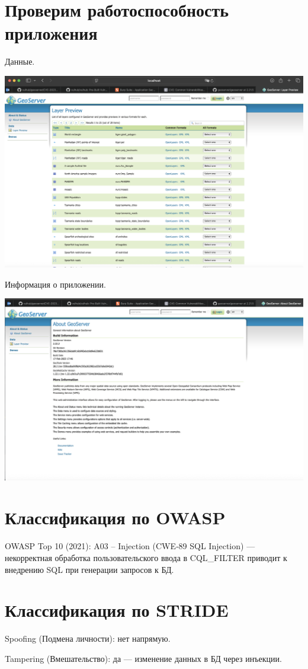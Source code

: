 \documentclass{article}
\begin{document}
\section{Проверим работоспособность приложения}
Данные.
\begin{center}
  \includegraphics[width=.7\textwidth]{yes}
\end{center}
Информация о приложении.
\begin{center}
  \includegraphics[width=.7\textwidth]{version}
\end{center}

\section{Классификация по OWASP}

OWASP Top 10 (2021): A03 – Injection (CWE‑89 SQL Injection) — некорректная обработка пользовательского ввода в CQL\_FILTER приводит к внедрению SQL при генерации запросов к БД.

\section{Классификация по STRIDE}

Spoofing (Подмена личности):  нет напрямую.

Tampering (Вмешательство): да — изменение данных в БД через инъекции.
\end{document}
